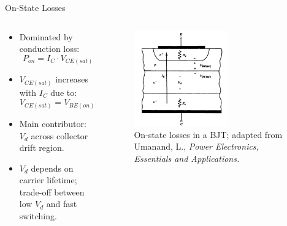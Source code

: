 \begin{frame}{On-State Losses}
    \begin{columns}
        \begin{column}{0.5\textwidth}
            \begin{itemize}
                \item Dominated by conduction loss:
                \[
                P_{on} = I_C \cdot V_{CE(sat)}
                \]
                \item $V_{CE(sat)}$ increases with $I_C$ due to:
                \[
                V_{CE(sat)} = V_{BE(on)} - V_{BC(sat)} + V_d + I_C(R_e + R_c)
                \]
                \item Main contributor: $V_d$ across collector drift region.
                \item $V_d$ depends on carrier lifetime; trade-off between low $V_d$ and fast switching.
            \end{itemize}
        \end{column}

\begin{column}{0.5\textwidth}
\begin{figure}
\centering
\includegraphics[width=0.6\textwidth]{fig/lec04/BJT_on_state_losses.png}
\caption{On-state losses in a BJT; adapted from Umanand, L., \textit{Power Electronics, Essentials and Applications.}}
\label{fig:bjt_on_state_losses}
\end{figure}
    \end{column}
    \end{columns}
\end{frame}


